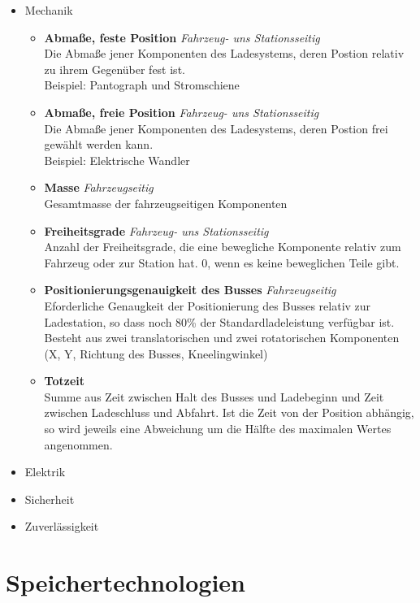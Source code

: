 \documentclass{scrartcl}
\begin{document}
\begin{itemize}
	\item Mechanik %
	\begin{itemize}
		\item \textbf{Abmaße, feste Position} \emph{Fahrzeug- uns Stationsseitig}\\
		Die Abmaße jener Komponenten des Ladesystems, deren Postion relativ zu ihrem Gegenüber fest ist.\\
		Beispiel: Pantograph und Stromschiene
		\item \textbf{Abmaße, freie Position} \emph{Fahrzeug- uns Stationsseitig}\\
		Die Abmaße jener Komponenten des Ladesystems, deren Postion frei gewählt werden kann.\\
		Beispiel: Elektrische Wandler
		\item \textbf{Masse} \emph{Fahrzeugseitig}\\
		Gesamtmasse der fahrzeugseitigen Komponenten
		\item \textbf{Freiheitsgrade} \emph{Fahrzeug- uns Stationsseitig}\\
		Anzahl der Freiheitsgrade, die eine bewegliche Komponente relativ zum Fahrzeug oder zur Station hat. 0, wenn es keine beweglichen Teile gibt.
		\item \textbf{Positionierungsgenauigkeit des Busses} \emph{Fahrzeugseitig} \\
		Eforderliche Genaugkeit der Positionierung des Busses relativ zur Ladestation, so dass noch 80\% der Standardladeleistung verfügbar ist. Besteht aus zwei translatorischen und zwei rotatorischen Komponenten (X, Y, Richtung des Busses, Kneelingwinkel)
		\item \textbf{Totzeit}\\
		Summe aus Zeit zwischen Halt des Busses und Ladebeginn und Zeit zwischen Ladeschluss und Abfahrt. Ist die Zeit von der Position abhängig, so wird jeweils eine Abweichung um die Hälfte des maximalen Wertes angenommen.

	\end{itemize}
	\item Elektrik
	\item Sicherheit
	\item Zuverlässigkeit
\end{itemize}

\section{Speichertechnologien}



\newpage

 

\end{document}
